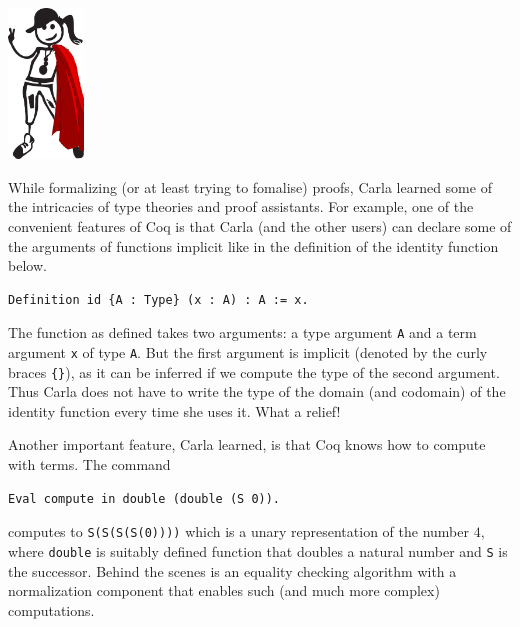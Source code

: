 \begin{center}
    \includegraphics[height=4cm]{img/carlaSuperwoman.jpg}
\end{center}

While formalizing (or at least trying to fomalise) proofs, Carla learned some of the intricacies of type theories and proof assistants. For example, one of the convenient features of Coq is that Carla (and the other users) can declare some of the arguments of functions implicit like in the definition of the identity function below.
%
\begin{lstlisting}[language=Coq]
    Definition id {A : Type} (x : A) : A := x.
\end{lstlisting}
%
The function as defined takes two arguments:
a type argument \lstinline[language=Coq]{A} and a term argument \lstinline[language=Coq]{x} of type \lstinline[language=Coq]{A}. But the first argument is implicit (denoted by the curly braces \lstinline[language=Coq]|{}|), as it can be inferred if we compute the type of the second argument. Thus Carla does not have to write the type of the domain (and codomain) of the identity function every time she uses it. What a relief!

Another important feature, Carla learned, is that Coq knows how to compute with terms. The command
%
\begin{lstlisting}[language=Coq]
    Eval compute in double (double (S 0)).
\end{lstlisting}
%
computes to \lstinline[language=Coq]{S(S(S(S(0))))} which is a unary representation of the number $4$, where \lstinline[language=Coq]{double} is suitably defined function that doubles a natural number and \lstinline[language=Coq]{S} is the successor. Behind the scenes is an equality checking algorithm with a normalization component that enables such (and much more complex) computations.

